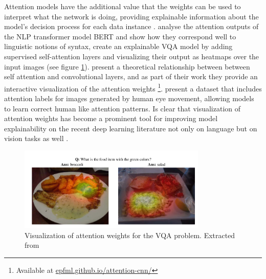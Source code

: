 Attention models have the additional value that the weights can be used to interpret what the network is doing, providing
explainable information about the model's decision process for each data instance \cite{wiegreffe_attention}.
 analyse the attention outputs of the NLP transformer model BERT and show how they correspond
well to linguistic notions of syntax,  create an explainable VQA model by adding
supervised self-attention layers and visualizing their output as heatmaps over the input images
(see figure \ref{fig:vqa}).  present a theoretical  relationship between
between self attention and convolutional layers, and as part of their work they provide an interactive visualization
of the attention weights \footnote{Available at \url{epfml.github.io/attention-cnn/}}.  present
a dataset that includes attention labels for images generated by human eye movement, allowing models to learn
correct human like attention patterns. Is clear that visualization of attention weights has become a prominent tool
for improving model explainability on the recent deep learning literature not only on language but on
vision tasks as well \cite{zhang_relation, johnston_depth, carion_object}.



\begin{figure}[ht]
	\begin{center}
	\includegraphics[width=0.8\textwidth]{./figures/soto.png}
	\caption[Attention on VQA]{Visualization of attention weights for the VQA problem. Extracted from  }
	\label{fig:vqa}
	\end{center}
\end{figure}

